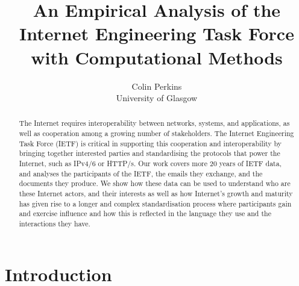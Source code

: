 \documentclass[twocolumn,10pt]{article}
\begin{document}
\title{An Empirical Analysis of the Internet Engineering Task Force 
       with Computational Methods}
\author{Colin Perkins\\University of Glasgow}
\maketitle
\begin{abstract}

  The Internet requires interoperability between networks, systems, and
  applications, as well as cooperation among a growing number of
  stakeholders. The Internet Engineering Task Force (IETF) is critical in
  supporting this cooperation and interoperability by bringing together
  interested parties and standardising the protocols that power the
  Internet, such as IPv4/6 or HTTP/s. Our work covers more 20 years of IETF
  data, and analyses the participants of the IETF, the emails they
  exchange, and the documents they produce. We show how these data can be
  used to understand who are these Internet actors, and their interests as
  well as how Internet's growth and maturity has given rise to a longer and
  complex standardisation process where participants gain and exercise
  influence and how this is reflected in the language they use and the
  interactions they have.
  

\end{abstract}
\section{Introduction}

%
\end{document}
